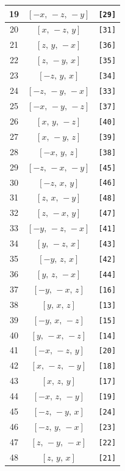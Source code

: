 \documentclass[fleqn,8pt]{jsarticle}
\begin{document}
\begin{longtable}{ccc}
19 & $\left[ - x,\, - z,\, - y \right]$ & {\tt [29]} \\ \hline
20 & $\left[ x,\, - z,\, y \right]$ & {\tt [31]} \\ \hline
21 & $\left[ z,\, y,\, - x \right]$ & {\tt [36]} \\ \hline
22 & $\left[ z,\, - y,\, x \right]$ & {\tt [35]} \\ \hline
23 & $\left[ - z,\, y,\, x \right]$ & {\tt [34]} \\ \hline
24 & $\left[ - z,\, - y,\, - x \right]$ & {\tt [33]} \\ \hline
25 & $\left[ - x,\, - y,\, - z \right]$ & {\tt [37]} \\ \hline
26 & $\left[ x,\, y,\, - z \right]$ & {\tt [40]} \\ \hline
27 & $\left[ x,\, - y,\, z \right]$ & {\tt [39]} \\ \hline
28 & $\left[ - x,\, y,\, z \right]$ & {\tt [38]} \\ \hline
29 & $\left[ - z,\, - x,\, - y \right]$ & {\tt [45]} \\ \hline
30 & $\left[ - z,\, x,\, y \right]$ & {\tt [46]} \\ \hline
31 & $\left[ z,\, x,\, - y \right]$ & {\tt [48]} \\ \hline
32 & $\left[ z,\, - x,\, y \right]$ & {\tt [47]} \\ \hline
33 & $\left[ - y,\, - z,\, - x \right]$ & {\tt [41]} \\ \hline
34 & $\left[ y,\, - z,\, x \right]$ & {\tt [43]} \\ \hline
35 & $\left[ - y,\, z,\, x \right]$ & {\tt [42]} \\ \hline
36 & $\left[ y,\, z,\, - x \right]$ & {\tt [44]} \\ \hline
37 & $\left[ - y,\, - x,\, z \right]$ & {\tt [16]} \\ \hline
38 & $\left[ y,\, x,\, z \right]$ & {\tt [13]} \\ \hline
39 & $\left[ - y,\, x,\, - z \right]$ & {\tt [15]} \\ \hline
40 & $\left[ y,\, - x,\, - z \right]$ & {\tt [14]} \\ \hline
41 & $\left[ - x,\, - z,\, y \right]$ & {\tt [20]} \\ \hline
42 & $\left[ x,\, - z,\, - y \right]$ & {\tt [18]} \\ \hline
43 & $\left[ x,\, z,\, y \right]$ & {\tt [17]} \\ \hline
44 & $\left[ - x,\, z,\, - y \right]$ & {\tt [19]} \\ \hline
45 & $\left[ - z,\, - y,\, x \right]$ & {\tt [24]} \\ \hline
46 & $\left[ - z,\, y,\, - x \right]$ & {\tt [23]} \\ \hline
47 & $\left[ z,\, - y,\, - x \right]$ & {\tt [22]} \\ \hline
48 & $\left[ z,\, y,\, x \right]$ & {\tt [21]} \\
\end{longtable}
\end{document}
